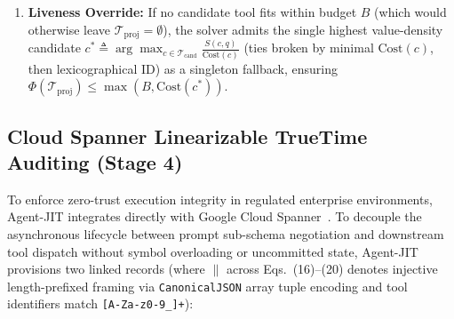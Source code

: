 \documentclass[conference,10pt]{IEEEtran}
\begin{document}
\begin{enumerate}
detached after $\text{fires}(\mathcal{W}) = 2m$; in a dedicated tight-budget sensitivity sweep at $B \in \{400, 600\}$ tokens---where composite wrapper footprints $\operatorname{Cost}(\mathcal{W}) \in [260, 420]$ tokens consume $43\%$--$100\%$ of $B$ and non-monotonic net cost replacements $\Delta C < 0$ occur on $34.0\%$ of multi-hop queries---the single-pass heuristic still matched the exact ILP optimum on $97.88\%$ [$832/850$, mean relative objective gap $2.18\%$ across the $18$ diverging queries] at $B = 400$ and $98.71\%$ [$839/850$, mean gap $1.74\%$ across $11$ queries] at $B = 600$, while enabling an optional $O(|\mathcal{T}_{\text{cand}}|)$ post-replacement slack-fill pass over previously skipped non-blocked atomic tools whenever $\Delta C < 0$ closed $100\%$ of the $\Delta C < 0$ slack divergences, raising exact ILP agreement to $99.18\%$ [$843/850$] at $B = 400$, $99.53\%$ [$846/850$] at $B = 600$, and $99.76\%$ [$848/850$] at $B = 2{,}000$ at $+0.04$~ms compute overhead).
    \item \textbf{Liveness Override:} If no candidate tool fits within budget $B$ (which would otherwise leave $\mathcal{T}_{\text{proj}} = \emptyset$), the solver admits the single highest value-density candidate $c^* \triangleq \arg\max_{c \in \mathcal{T}_{\text{cand}}} \frac{S(c, q)}{\text{Cost}(c)}$ (ties broken by minimal $\text{Cost}(c)$, then lexicographical ID) as a singleton fallback, ensuring $\Phi(\mathcal{T}_{\text{proj}}) \le \max(B, \text{Cost}(c^*))$.
\end{enumerate}

\subsection{Cloud Spanner Linearizable TrueTime Auditing (Stage 4)}
To enforce zero-trust execution integrity in regulated enterprise environments, Agent-JIT integrates directly with Google Cloud Spanner~\cite{corbett2013spanner}. To decouple the asynchronous lifecycle between prompt sub-schema negotiation and downstream tool dispatch without symbol overloading or uncommitted state, Agent-JIT provisions two linked records (where $\parallel$ across Eqs.~(16)--(20) denotes injective length-prefixed framing via \texttt{CanonicalJSON} array tuple encoding and tool identifiers match \texttt{[A-Za-z0-9\_]+}):
\end{document}
